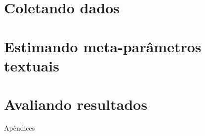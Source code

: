 \documentclass[
12pt,				%
openright,			%
twoside,			%
a4paper,			%
english,			%
french,				%
spanish,			%
brazil				%
]{abntex2}
\begin{document}
\section{Coletando dados}

\section{Estimando meta-parâmetros textuais}

\section{Avaliando resultados}		
\postextual



%
%


Apêndices

\printindex
\end{document}
